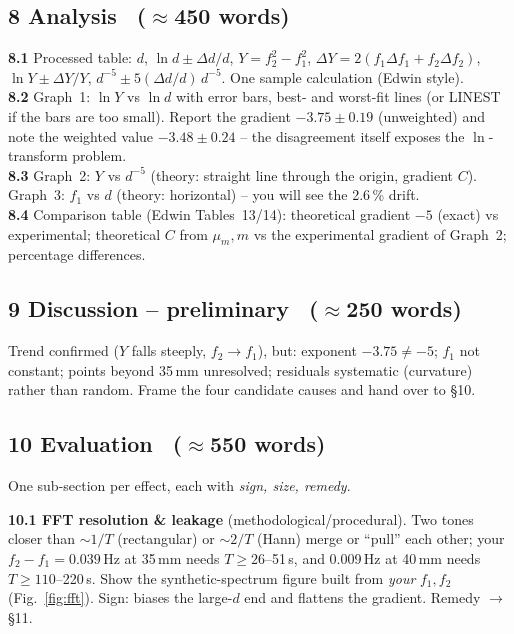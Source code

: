 \documentclass[11pt,a4paper]{article}
\newcommand{\Y}{Y}                                   %
\newcommand{\mum}{\mu_m}
\newcommand{\words}[1]{~{\small\color{gray}($\approx$#1 words)}}
\begin{document}
\subsection*{8 Analysis \words{450}}
\textbf{8.1} Processed table: $d$, $\ln d\pm\Delta d/d$, $\Y=f_2^2-f_1^2$,
$\Delta\Y=2(f_1\Delta f_1+f_2\Delta f_2)$, $\ln\Y\pm\Delta\Y/\Y$,
$d^{-5}\pm5(\Delta d/d)\,d^{-5}$. One sample calculation (Edwin style).\\
\textbf{8.2} Graph~1: $\ln\Y$ vs $\ln d$ with error bars, best- and worst-fit lines (or
LINEST if the bars are too small). Report the gradient $-3.75\pm0.19$ (unweighted) and
note the weighted value $-3.48\pm0.24$ -- the disagreement itself exposes the
$\ln$-transform problem.\\
\textbf{8.3} Graph~2: $\Y$ vs $d^{-5}$ (theory: straight line through the origin, gradient
$C$). Graph~3: $f_1$ vs $d$ (theory: horizontal) -- you will see the 2.6\,\% drift.\\
\textbf{8.4} Comparison table (Edwin Tables~13/14): theoretical gradient $-5$ (exact) vs
experimental; theoretical $C$ from $\mum,m$ vs the experimental gradient of Graph~2;
percentage differences.

\subsection*{9 Discussion -- preliminary \words{250}}
Trend confirmed ($\Y$ falls steeply, $f_2\to f_1$), but: exponent $-3.75\neq-5$; $f_1$ not
constant; points beyond 35\,mm unresolved; residuals systematic (curvature) rather than
random. Frame the four candidate causes and hand over to \S10.

\subsection*{10 Evaluation \words{550}}
One sub-section per effect, each with \emph{sign, size, remedy}.

\textbf{10.1 FFT resolution \& leakage} (methodological/procedural). Two tones closer than
$\sim1/T$ (rectangular) or $\sim2/T$ (Hann) merge or ``pull'' each other; your
$f_2-f_1=0.039$\,Hz at 35\,mm needs $T\ge26$--51\,s, and 0.009\,Hz at 40\,mm needs
$T\ge110$--220\,s. Show the synthetic-spectrum figure built from \emph{your} $f_1,f_2$
(Fig.~\ref{fig:fft}). Sign: biases the large-$d$ end and flattens the gradient. Remedy
$\to$ \S11.
\end{document}
